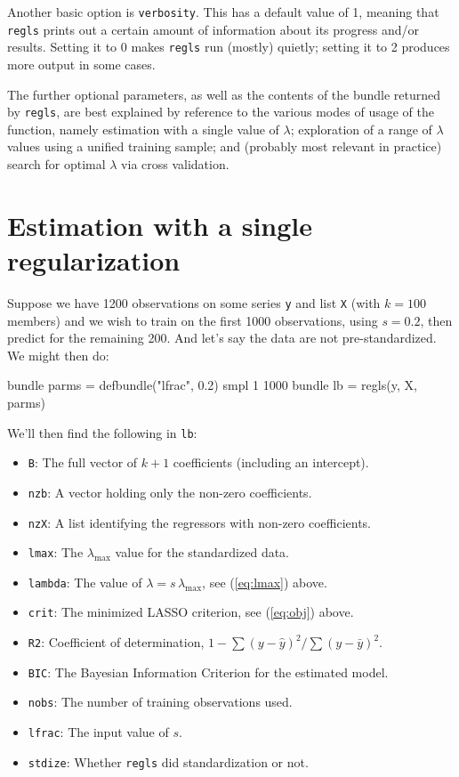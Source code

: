 \documentclass{article}
\begin{document}
Another basic option is \texttt{verbosity}. This has a default value
of 1, meaning that \texttt{regls} prints out a certain amount of
information about its progress and/or results. Setting it to 0 makes
\texttt{regls} run (mostly) quietly; setting it to 2 produces more
output in some cases.

The further optional parameters, as well as the contents of the bundle
returned by \texttt{regls}, are best explained by reference to the
various modes of usage of the function, namely estimation with a
single value of $\lambda$; exploration of a range of $\lambda$ values
using a unified training sample; and (probably most relevant in
practice) search for optimal $\lambda$ via cross validation.

\section{Estimation with a single regularization}
\label{sec:single-lambda}

Suppose we have 1200 observations on some series \texttt{y} and list
\texttt{X} (with $k=100$ members) and we wish to train on the first
1000 observations, using $s = 0.2$, then predict for the remaining
200. And let's say the data are not pre-standardized. We might then
do:
\begin{code}
bundle parms = defbundle("lfrac", 0.2)
smpl 1 1000
bundle lb = regls(y, X, parms)
\end{code}
We'll then find the following in \texttt{lb}:
\begin{itemize}
\item \texttt{B}: The full vector of $k+1$ coefficients (including an
  intercept).
\item \texttt{nzb}: A vector holding only the non-zero coefficients.
\item \texttt{nzX}: A list identifying the regressors with non-zero
  coefficients.
\item \texttt{lmax}: The $\lambda_{\max}$ value for the standardized
  data.
\item \texttt{lambda}: The value of $\lambda = s\,\lambda_{\max}$, see
  (\ref{eq:lmax}) above.
\item \texttt{crit}: The minimized LASSO criterion, see (\ref{eq:obj})
  above.
\item \texttt{R2}: Coefficient of determination,
  $1 - \sum(y-\hat{y})^2/\sum(y-\bar{y})^2$.
\item \texttt{BIC}: The Bayesian Information Criterion for the
  estimated model.
\item \texttt{nobs}: The number of training observations used.
\item \texttt{lfrac}: The input value of $s$.
\item \texttt{stdize}: Whether \texttt{regls} did standardization or
  not.
\end{itemize}
\end{document}
